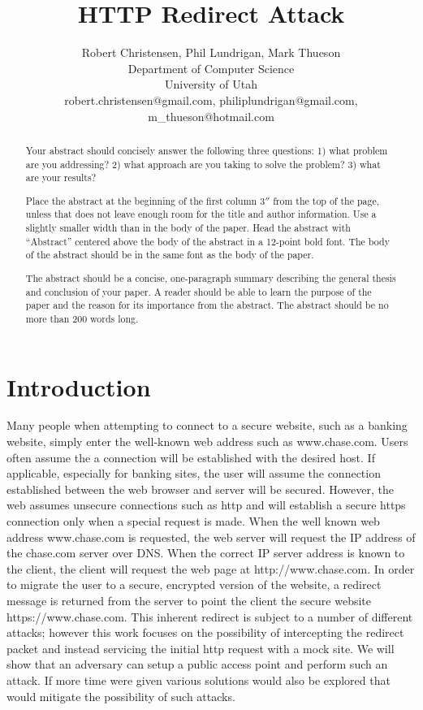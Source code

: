\documentclass{article}
\title{HTTP Redirect Attack}
\author{Robert Christensen, Phil Lundrigan, Mark Thueson\\
Department of Computer Science\\
University of Utah \\
robert.christensen@gmail.com, philiplundrigan@gmail.com, m\_thueson@hotmail.com}
\begin{document}
\maketitle

\begin{abstract}
  Your abstract should concisely answer the following three questions: 1) what problem are you addressing? 2) what approach are you taking to solve the problem? 3) what are your results?
  
  Place the abstract at the beginning of the first column 3$''$ from the
top of the page, unless that does not leave enough room for the title
and author information. Use a slightly smaller width than in the body
of the paper. Head the abstract with ``Abstract'' centered above the
body of the abstract in a 12-point bold font. The body of the abstract
should be in the same font as the body of the paper.

The abstract should be a concise, one-paragraph summary describing the
general thesis and conclusion of your paper. A reader should be able
to learn the purpose of the paper and the reason for its importance
from the abstract. The abstract should be no more than 200 words long.
\end{abstract}

\section{Introduction}
Many people when attempting to connect to a secure website, such as a banking website, simply enter the well-known web address such as www.chase.com. Users often assume the a connection will be established with the desired host.  If applicable, especially for banking sites, the user will assume the connection established between the web browser and server will be secured.  However, the web assumes unsecure connections such as http and will establish a secure https connection only when a special request is made.  When the well known web address www.chase.com is requested, the web server will request the IP address of the chase.com server over DNS.  When the correct IP server address is known to the client, the client will request the web page at http://www.chase.com.  In order to migrate the user to a secure, encrypted version of the website, a redirect message is returned from the server to point the client the secure website https://www.chase.com.  This inherent redirect is subject to a number of different attacks; however this work focuses on the possibility of intercepting the redirect packet and instead servicing the initial http request with a mock site.  We will show that an adversary can setup a public access point and perform such an attack.  If more time were given various solutions would also be explored that would mitigate the possibility of such attacks.
\end{document}
